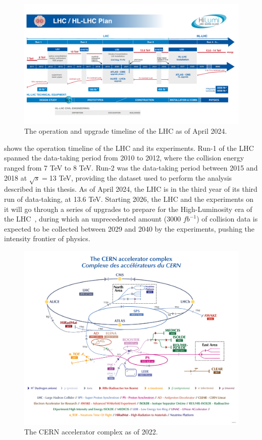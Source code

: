 \begin{figure}[!ht]
    \centering
    \includegraphics[width=0.8\linewidth]{figures/experiment/HL-LHC_Janvier2022.pdf}
    \caption{The operation and upgrade timeline of the LHC as of April 2024.~\cite{hl-lhc-web}}
    \label{fig:lhc-timeline}
\end{figure}

 shows the operation timeline of the LHC and its experiments. Run-1 of the LHC spanned the data-taking period from 2010 to 2012, where the collision energy ranged from 7 TeV to 8 TeV. Run-2 was the data-taking period between 2015 and 2018 at $\sqrt{s}=$13 TeV, providing the dataset used to perform the analysis described in this thesis. As of April 2024, the LHC is in the third year of its third run of data-taking, at 13.6 TeV. Starting 2026, the LHC and the experiments on it will go through a series of upgrades to prepare for the High-Luminosity era of the LHC~\cite{Aberle:2749422}, during which an unprecedented amount (3000 $fb^{-1}$) of collision data is expected to be collected between 2029 and 2040 by the experiments, pushing the intensity frontier of physics.

\begin{figure}[!ht]
    \centering
    \includegraphics[width=0.8\linewidth]{figures/experiment/CCC-v2022.png}
    \caption{The CERN accelerator complex as of 2022.\cite{Lopienska:2800984}}
    \label{fig:cern-acc-comp}
\end{figure}

